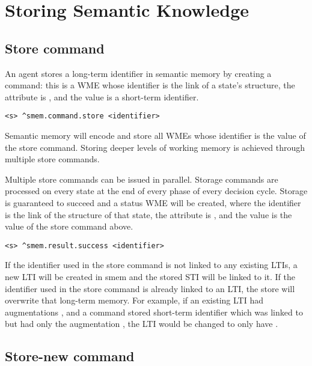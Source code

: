 \section{Storing Semantic Knowledge}
\label{SMEM-store}

\subsection{Store command}

An agent stores a long-term identifier in semantic memory by creating a  command: this is a WME whose identifier is the  link of a state's  structure, the attribute is , and the value is a short-term identifier.

\begin{verbatim}
<s> ^smem.command.store <identifier>
\end{verbatim}

Semantic memory will encode and store all WMEs whose identifier is the value of the store command.
Storing deeper levels of working memory is achieved through multiple store commands.

Multiple store commands can be issued in parallel.
Storage commands are processed on every state at the end of every phase of every decision cycle.
Storage is guaranteed to succeed and a status WME will be created, where the identifier is the  link of the  structure of that state, the attribute is , and the value is the value of the store command above.

\begin{verbatim}
<s> ^smem.result.success <identifier>
\end{verbatim}

If the identifier used in the store command is not linked to any existing LTIs, a new LTI will be created in smem and the stored STI will be linked to it. If the identifier used in the store command is already linked to an LTI, the store will overwrite that long-term memory.
For example, if an existing LTI  had augmentations , and a  command stored short-term identifier  which was linked to  but had only the augmentation , the LTI  would be changed to only have .

\subsection{Store-new command}

